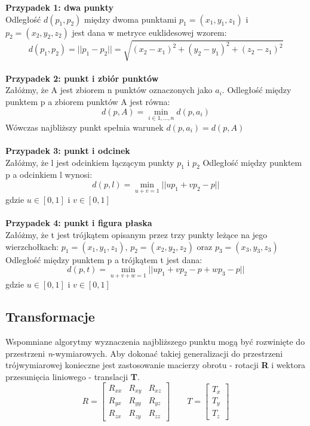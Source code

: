 \documentclass[12pt]{article}
\begin{document}
\textbf{Przypadek 1: dwa punkty}
\\
Odległość $d(p_{1}, p_{2})$ między dwoma punktami $p_{1} = (x_{1}, y_{1}, z_{1})$
i $p_{2} = (x_{2}, y_{2}, z_{2})$ jest dana w metryce euklidesowej wzorem: 
\[d(p_{1}, p_{2}) = ||p_{1} - p_{2}|| = \sqrt{(x_{2}-x_{1})^2+(y_{2}-y_{1})^2+(z_{2}-z_{1})^2}\]
\\
\textbf{Przypadek 2: punkt i zbiór punktów}
\\
Załóżmy, że A jest zbiorem n punktów oznaczonych jako $a_{i}$. Odległość między punktem p a zbiorem punktów A jest równa:
\[d(p, A) = \min_{i \in {1,...,n}} d(p, a_{i})\]
Wówczas najbliższy punkt spełnia warunek $d(p, a_{i}) = d(p, A)$
\\
\\
\textbf{Przypadek 3: punkt i odcinek}
\\
Załóżmy, że l jest odcinkiem łączącym punkty $p_{1}$ i $p_{2}$ Odległość między punktem p a odcinkiem l wynosi:
\[d(p, l) = \min_{u+v=1} ||up_{1}+vp_{2}-p|| \]
gdzie $u \in [0, 1]$ i $v \in [0, 1]$ 
\\
\\
\textbf{Przypadek 4: punkt i figura płaska}
\\
Załóżmy, że t jest trójkątem opisanym przez trzy punkty leżące na jego wierzchołkach: $p_{1} = (x_{1}, y_{1}, z_{1})$, $p_{2} = (x_{2}, y_{2}, z_{2})$ oraz $p_{3} = (x_{3}, y_{3}, z_{3})$ Odległość między punktem p a trójkątem t jest dana:
\[d(p, t) = \min_{u+v+w=1} ||up_{1}+vp_{2}-p+wp_{3}-p|| \]
gdzie $u \in [0, 1]$ i $v \in [0, 1]$ 
\\
\subsection{Transformacje}
Wspomniane algorytmy wyznaczenia najbliższego punktu mogą być rozwinięte do przestrzeni \emph{n}-wymiarowych. Aby dokonać takiej generalizacji do przestrzeni trójwymiarowej konieczne jest zastosowanie macierzy obrotu - rotacji \textbf{R} i wektora przesunięcia liniowego - translacji \textbf{T}.
\[
R = \begin{bmatrix}
R_{xx} & R_{xy} & R_{xz} \\
R_{yx} & R_{yy} & R_{yz} \\
R_{zx} & R_{zy} & R_{zz}
\end{bmatrix}
\qquad
T = \begin{bmatrix}
T_{x} \\ T_{y} \\ T_{z}
\end{bmatrix}
\]
\end{document}
